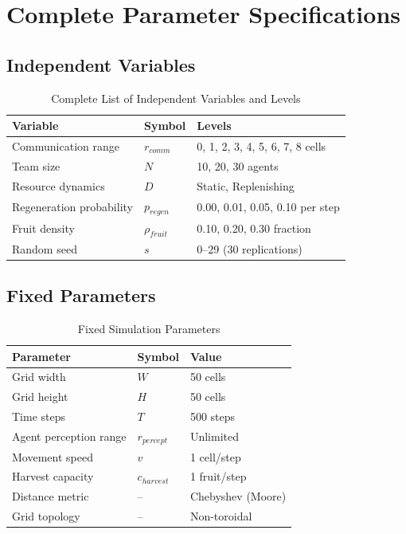 
\section{Complete Parameter Specifications}

\subsection{Independent Variables}

\begin{table}[h]
\centering
\caption{Complete List of Independent Variables and Levels}
\begin{tabular}{lll}
\toprule
\textbf{Variable} & \textbf{Symbol} & \textbf{Levels} \\
\midrule
Communication range & $r_{comm}$ & 0, 1, 2, 3, 4, 5, 6, 7, 8 cells \\
Team size & $N$ & 10, 20, 30 agents \\
Resource dynamics & $D$ & Static, Replenishing \\
Regeneration probability & $p_{regen}$ & 0.00, 0.01, 0.05, 0.10 per step \\
Fruit density & $\rho_{fruit}$ & 0.10, 0.20, 0.30 fraction \\
Random seed & $s$ & 0--29 (30 replications) \\
\bottomrule
\end{tabular}
\end{table}

\subsection{Fixed Parameters}

\begin{table}[h]
\centering
\caption{Fixed Simulation Parameters}
\begin{tabular}{lll}
\toprule
\textbf{Parameter} & \textbf{Symbol} & \textbf{Value} \\
\midrule
Grid width & $W$ & 50 cells \\
Grid height & $H$ & 50 cells \\
Time steps & $T$ & 500 steps \\
Agent perception range & $r_{percept}$ & Unlimited \\
Movement speed & $v$ & 1 cell/step \\
Harvest capacity & $c_{harvest}$ & 1 fruit/step \\
Distance metric & -- & Chebyshev (Moore) \\
Grid topology & -- & Non-toroidal \\
\bottomrule
\end{tabular}
\end{table}

